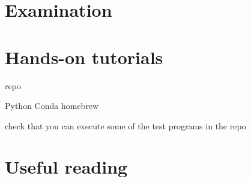 \documentclass[12pt]{article}
\numberwithin{equation}{section}
\begin{document}
\begin{spacing}{1.1}
\section{Examination}



\section{Hands-on tutorials}

repo

Python   Conda homebrew

check that you can execute some of the test programs in the repo



\section{Useful reading}


\end{spacing}
\end{document}
